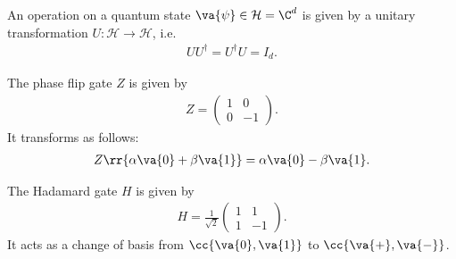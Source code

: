 \documentclass{article}
\begin{document}
\begin{definition}
  \label{def:quantum-operation}
  An operation on a quantum state $ \va{ \psi } \in \mathcal H = \C^d$ is given by
  a unitary transformation $U:\mathcal H \to \mathcal H$, i.e.
  \begin{align*}
    UU^\dagger = U^\dagger U = I_d.
  \end{align*}
\end{definition}


\begin{definition}
  \label{def:phase-flip}
  The phase flip gate $Z$ is given by
  \begin{align*}
    Z = \begin{pmatrix} 1 & 0 \\ 0 & -1 \end{pmatrix}.
  \end{align*}
  It transforms as follows:
  \begin{align*}
    Z \rr{ \alpha \va{ 0 } + \beta \va{ 1 } } = \alpha \va{ 0 } - \beta \va{ 1 }.
  \end{align*}
\end{definition}


\begin{definition}
  \label{def:hadamard}
  The Hadamard gate $H$ is given by
  \begin{align*}
    H = \frac{1}{\sqrt{2}} \begin{pmatrix} 1 & 1 \\ 1 & -1 \end{pmatrix}.
  \end{align*}
  It acts as a change of basis from $ \cc{ \va{ 0 }, \va{ 1 } } $ to $ \cc{ \va{ + }, \va{ - } }$.
\end{definition}
\end{document}
